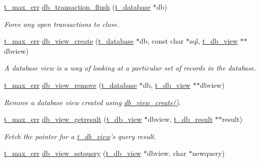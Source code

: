 \begin{DoxyCompactItemize}
\hyperlink{group__datatypes_ga73edaae82b318855cc09fac994918165}{t\_\-max\_\-err} \hyperlink{group__database_gabf78d551bd8ed0c81a4881663dc445be}{db\_\-transaction\_\-flush} (\hyperlink{structt__object}{t\_\-database} $\ast$db)
\begin{DoxyCompactList}\small\item\em Force any open transactions to close. \item\end{DoxyCompactList}\item 
\hyperlink{group__datatypes_ga73edaae82b318855cc09fac994918165}{t\_\-max\_\-err} \hyperlink{group__database_ga70b24ae188489537db137f67f5d01388}{db\_\-view\_\-create} (\hyperlink{structt__object}{t\_\-database} $\ast$db, const char $\ast$sql, \hyperlink{structt__object}{t\_\-db\_\-view} $\ast$$\ast$dbview)
\begin{DoxyCompactList}\small\item\em A database view is a way of looking at a particular set of records in the database. \item\end{DoxyCompactList}\item 
\hyperlink{group__datatypes_ga73edaae82b318855cc09fac994918165}{t\_\-max\_\-err} \hyperlink{group__database_ga0e0c3cfbb3459545a4868630cf6e8807}{db\_\-view\_\-remove} (\hyperlink{structt__object}{t\_\-database} $\ast$db, \hyperlink{structt__object}{t\_\-db\_\-view} $\ast$$\ast$dbview)
\begin{DoxyCompactList}\small\item\em Remove a database view created using \hyperlink{group__database_ga70b24ae188489537db137f67f5d01388}{db\_\-view\_\-create()}. \item\end{DoxyCompactList}\item 
\hyperlink{group__datatypes_ga73edaae82b318855cc09fac994918165}{t\_\-max\_\-err} \hyperlink{group__database_ga40de375c540b3551ba42d7a2643aa89f}{db\_\-view\_\-getresult} (\hyperlink{structt__object}{t\_\-db\_\-view} $\ast$dbview, \hyperlink{structt__object}{t\_\-db\_\-result} $\ast$$\ast$result)
\begin{DoxyCompactList}\small\item\em Fetch the pointer for a \hyperlink{group__database_gac9ea40a519578e26498dd61ea98b5cf2}{t\_\-db\_\-view}'s query result. \item\end{DoxyCompactList}\item 
\hyperlink{group__datatypes_ga73edaae82b318855cc09fac994918165}{t\_\-max\_\-err} \hyperlink{group__database_ga0474ea3231e953760e5a32a277c0279d}{db\_\-view\_\-setquery} (\hyperlink{structt__object}{t\_\-db\_\-view} $\ast$dbview, char $\ast$newquery)
$$
\end{DoxyCompactItemize}

